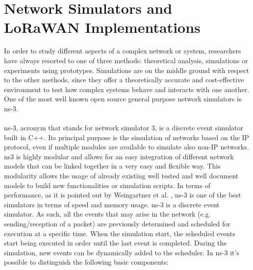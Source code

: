 \section{Network Simulators and LoRaWAN Implementations}
\label{sec:lora-sim}
In order to study different aspects of a complex network or system, researchers have always resorted to one of three methods: theoretical analysis, simulations or experiments using prototypes. Simulations are on the middle ground with respect to the other methods, since they offer a theoretically accurate and cost-effective environment to test how complex systems behave and interacts with one another. One of the most well known open source general purpose network simulators is ns-3. \\\\
ns-3, acronym that stands for network simulator 3, is a discrete event simulator built in C++. Its principal purpose is the simulation of networks based on the IP protocol, even if multiple modules are available to simulate also non-IP networks. ns3 is highly modular and allows for an easy integration of different network models that can be linked together in a very easy and flexible way. This modularity allows the usage of already existing well tested and well document models to build new functionalities or simulation scripts. In terms of performance, as it is pointed out by Weingartner et al. \cite{ref:soa-ns-comp}, ns-3 is one of the best simulators in terms of speed and memory usage.
ns-3 is a discrete event simulator. As such, all the events that may arise in the network (e.g. sending/reception of a packet) are previously determined and scheduled for execution at a specific time. When the simulation start, the scheduled events start being executed in order until the last event is completed. During the simulation, new events can be dynamically added to the scheduler. In ns-3 it's possible to distinguish the following basic components:

